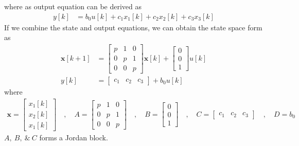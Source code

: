 \documentclass[twoside]{article}
\begin{document}
%
where as output equation can be derived as
%
\begin{align*}
y[k] &= b_0 u[k] + c_1 x_1[k] + c_2 x_2[k] + c_3 x_3[k]
\end{align*}
%
If we combine the state and output equations, we
can obtain the state space form as
%
\begin{align*}
  \mathbf{x}[k+1] &= \left[ \begin{array}{ccc} p & 1 & 0\\ 0 & p & 1
    \\ 0 & 0 & p \end{array} \right] \mathbf{x}[k]
   + 
  \left[ \begin{array}{c} 0 \\ 0
    \\ 1 \end{array} \right] u[k]
\\
y[k] &= \left[ \begin{array}{ccc} c_1 & c_2 & c_3 \end{array} \right]
+ b_0 u[k]
\end{align*}
%
where 
%
\begin{align*}
\mathbf{x} = \left[ \begin{array}{c} x_1[k] \\ x_2[k] \\
x_1[k] \end{array} \right] \quad , \quad
A = \left[ \begin{array}{ccc} p & 1 & 0 \\ 0 & p & 1
    \\ 0 & 0 & p \end{array} \right]
\quad , \quad 
B = \left[ \begin{array}{c} 0 \\ 0
    \\ 1 \end{array} \right]
\quad , \quad
C = \left[ \begin{array}{ccc} c_1 & c_2 & c_3 \end{array} \right]
\quad , \quad
D = b_0
\end{align*}
%
$A, \ B, \ \& \ C$ forms a Jordan block. 
\end{document}
